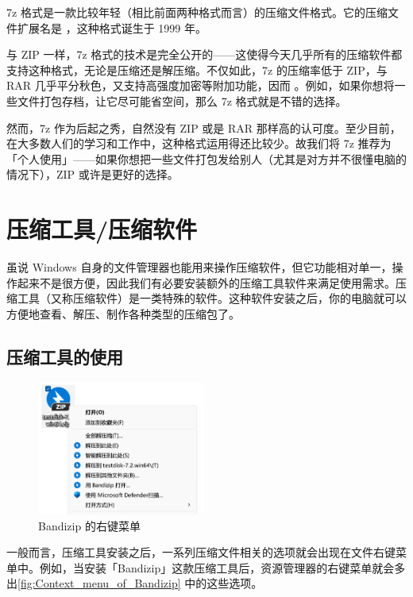 7z 格式是一款比较年轻（相比前面两种格式而言）的压缩文件格式。它的压缩文件扩展名是 ，这种格式诞生于 1999 年。

与 ZIP 一样，7z 格式的技术是完全公开的——这使得今天几乎所有的压缩软件都支持这种格式，无论是压缩还是解压缩。不仅如此，7z 的压缩率低于 ZIP，与 RAR 几乎平分秋色，又支持高强度加密等附加功能，因而 。例如，如果你想将一些文件打包存档，让它尽可能省空间，那么 7z 格式就是不错的选择。

然而，7z 作为后起之秀，自然没有 ZIP 或是 RAR 那样高的认可度。至少目前，在大多数人们的学习和工作中，这种格式运用得还比较少。故我们将 7z 推荐为「个人使用」——如果你想把一些文件打包发给别人（尤其是对方并不很懂电脑的情况下），ZIP 或许是更好的选择。

\section{压缩工具/压缩软件}

虽说 Windows 自身的文件管理器也能用来操作压缩软件，但它功能相对单一，操作起来不是很方便，因此我们有必要安装额外的压缩工具软件来满足使用需求。压缩工具（又称压缩软件）是一类特殊的软件。这种软件安装之后，你的电脑就可以方便地查看、解压、制作各种类型的压缩包了。

\subsection{压缩工具的使用}

\begin{figure}
  \centering
  \vspace*{-1.5cm}
  \includegraphics[width=5.5cm]{assets/software/Context_menu_of_Bandizip.png}
  \caption{Bandizip 的右键菜单}
  \label{fig:Context_menu_of_Bandizip}
\end{figure}

一般而言，压缩工具安装之后，一系列压缩文件相关的选项就会出现在文件右键菜单中。例如，当安装「Bandizip」这款压缩工具后，资源管理器的右键菜单就会多出\autoref{fig:Context_menu_of_Bandizip} 中的这些选项。

